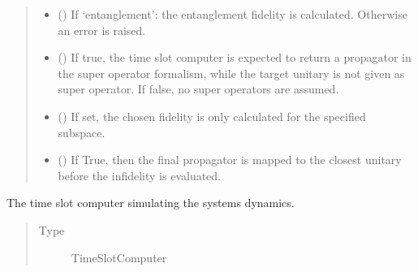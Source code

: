 \documentclass[letterpaper,10pt,english]{sphinxmanual}
\begin{document}
\begin{fulllineitems}
\begin{quote}
\begin{description}
\begin{itemize}
\item {} 
 (\sphinxstyleliteralemphasis{\sphinxupquote{, }}) \textendash{} If ‘entanglement’: the entanglement fidelity is calculated.
Otherwise an error is raised.

\item {} 
 (\sphinxstyleliteralemphasis{\sphinxupquote{, }}) \textendash{} If true, the time slot computer is expected to return a propagator in
the super operator formalism, while the target unitary is not given as
super operator.
If false, no super operators are assumed.

\item {} 
 (\sphinxstyleliteralemphasis{\sphinxupquote{, }}) \textendash{} If set, the chosen fidelity is only calculated for the specified
subspace.

\item {} 
 (\sphinxstyleliteralemphasis{\sphinxupquote{, }}) \textendash{} If True, then the final propagator is mapped to the closest unitary
before the infidelity is evaluated.

\end{itemize}

\end{description}\end{quote}

\begin{fulllineitems}
\label{\detokenize{qsim:qsim.cost_functions.OperationInfidelity.solver}}
The time slot computer simulating the systems dynamics.
\begin{quote}\begin{description}
\item[{Type}] \leavevmode
TimeSlotComputer


\end{description}
\end{quote}
\end{fulllineitems}
\end{fulllineitems}
\end{document}
